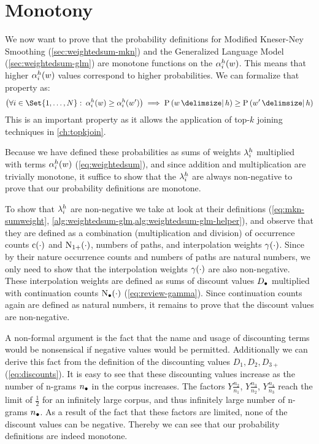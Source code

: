 
\section{Monotony}
\label{sec:monotony}

We now want to prove that the probability definitions for Modified Kneser-Ney
Smoothing (\cref{sec:weightedsum-mkn}) and the Generalized Language Model
(\cref{sec:weightedsum-glm}) are monotone functions on the $\alpha^h_i(w)$.
This means that higher $\alpha^h_i(w)$ values correspond to higher
probabilities.
We can formalize that property as:
\begin{equation}
  \big(\forall i \in \Set{1, \ldots, N}: \: \SumArg^h_i(w) \geq \SumArg^h_i(w^\prime)\big)
    \implies \Prob{w}{h} \geq \Prob{w^\prime}{h}
\end{equation}
This is an important property as it allows the application of top-$k$ joining
techniques in \cref{ch:topkjoin}.

Because we have defined these probabilities as sums of weights $\lambda^h_i$
multiplied with terms $\alpha^h_i(w)$ (\cref{eq:weightedsum}), and since
addition and multiplication are trivially monotone, it suffice to show that the
$\lambda^h_i$ are always non-negative to prove that our probability
definitions are monotone.

To show that $\lambda^h_i$ are non-negative we take at look at their
definitions (\cref{eq:mkn-sumweight},
\cref{alg:weightedsum-glm,alg:weightedsum-glm-helper}),
and observe that they are defined as a combination (multiplication and
division) of occurrence counts $\operatorname{c}(\cdot)$ and
$\operatorname{N}_{1+}(\cdot)$, numbers of paths, and interpolation weights
$\gamma(\cdot)$.
Since by their nature occurrence counts and numbers of paths are natural
numbers, we only need to show that the interpolation weights
$\gamma(\cdot)$ are also non-negative.
These interpolation weights are defined as sums of discount values
$D_\bullet$ multiplied with continuation counts
$\operatorname{N}_\bullet(\cdot)$ (\cref{eq:review-gamma}).
Since continuation counts again are defined as natural numbers, it remains to
prove that the discount values are non-negative.

A non-formal argument is the fact that the name and usage of discounting terms
would be nonsensical if negative values would be permitted.
Additionally we can derive this fact from the definition of the discounting
values $D_1, D_2, D_{3+}$ (\cref{eq:discounts}).
It is easy to see that these discounting values increase as the number of
n-grams $n_\bullet$ in the corpus increases.
The factors $Y \frac{n_2}{n_1}$, $Y \frac{n_3}{n_2}$, $Y \frac{n_4}{n_3}$ reach
the limit of $\frac{1}{2}$ for an infinitely large corpus, and thus infinitely
large number of n-grams $n_\bullet$.
As a result of the fact that these factors are limited, none of the discount
values can be negative.
Thereby we can see that our probability definitions are indeed monotone.
